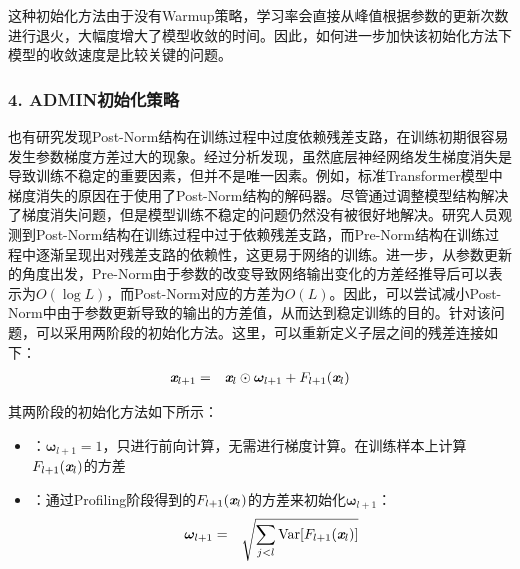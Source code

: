 \parinterval 这种初始化方法由于没有Warmup策略，学习率会直接从峰值根据参数的更新次数进行退火，大幅度增大了模型收敛的时间。因此，如何进一步加快该初始化方法下模型的收敛速度是比较关键的问题。


\subsubsection{4. ADMIN初始化策略}

\parinterval 也有研究发现Post-Norm结构在训练过程中过度依赖残差支路，在训练初期很容易发生参数梯度方差过大的现象。经过分析发现，虽然底层神经网络发生梯度消失是导致训练不稳定的重要因素，但并不是唯一因素。例如，标准Transformer模型中梯度消失的原因在于使用了Post-Norm结构的解码器。尽管通过调整模型结构解决了梯度消失问题，但是模型训练不稳定的问题仍然没有被很好地解决。研究人员观测到Post-Norm结构在训练过程中过于依赖残差支路，而Pre-Norm结构在训练过程中逐渐呈现出对残差支路的依赖性，这更易于网络的训练。进一步，从参数更新的角度出发，Pre-Norm由于参数的改变导致网络输出变化的方差经推导后可以表示为$O(\log L)$，而Post-Norm对应的方差为$O(L)$。因此，可以尝试减小Post-Norm中由于参数更新导致的输出的方差值，从而达到稳定训练的目的。针对该问题，可以采用两阶段的初始化方法。这里，可以重新定义子层之间的残差连接如下：
\begin{eqnarray}
\textbf{\em x}_{l+1} &=& \textbf{\em x}_l \odot {\bm  \omega_{l+1}} + F_{l+1}(\textbf{\em x}_l)
\label{eq:15-47}
\end{eqnarray}

\noindent 其两阶段的初始化方法如下所示：

\begin{itemize}
\vspace{0.5em}
\item {\small{}}：${\bm  \omega_{l+1}} = 1$，只进行前向计算，无需进行梯度计算。在训练样本上计算$F_{l+1}(\textbf{\em x}_l)$的方差
\vspace{0.5em}
\item {\small{}}：通过Profiling阶段得到的$F_{l+1}(\textbf{\em x}_l)$的方差来初始化$\bm  \omega_{l+1}$：
\begin{eqnarray}
{\bm \omega_{l+1}} &=& \sqrt{\sum_{j<l}\textrm{Var}[F_{l+1}(\textbf{\em x}_l)]}
\label{eq:15-48}
\end{eqnarray}
\end{itemize}

